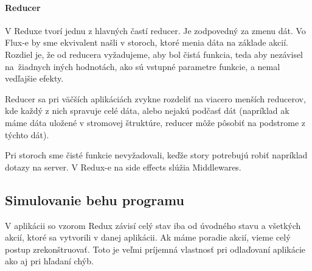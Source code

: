 \paragraph{Reducer}
V Reduxe tvorí jednu z hlavných častí reducer. Je zodpovedný za zmenu dát. Vo Flux-e by sme ekvivalent našli v storoch, ktoré menia dáta na základe akcií. Rozdiel je, že od reducera vyžadujeme, aby bol čistá funkcia, teda aby nezávisel na~žiadnych iných hodnotách, ako sú vstupné parametre funkcie, a nemal vedľajšie efekty. 

Reducer sa pri väčších aplikáciách zvykne rozdeliť na viacero menších reducerov, kde každý z nich spravuje celé dáta, alebo nejakú podčasť dát (napríklad ak máme dáta uložené v stromovej štruktúre, reducer môže pôsobiť na podstrome z týchto dát).

Pri storoch sme čisté funkcie nevyžadovali, keďže story potrebujú robiť napríklad dotazy na server. V Redux-e na side effects slúžia Middlewares.

\subsection{Simulovanie behu programu}
V aplikácii so vzorom Redux závisí celý stav iba od úvodného stavu a všetkých akcií, ktoré sa vytvorili v danej aplikácii. Ak máme poradie akcií, vieme celý postup zrekonštruovať. Toto je veľmi príjemná vlastnosť pri odlaďovaní aplikácie ako aj pri hľadaní chýb.
